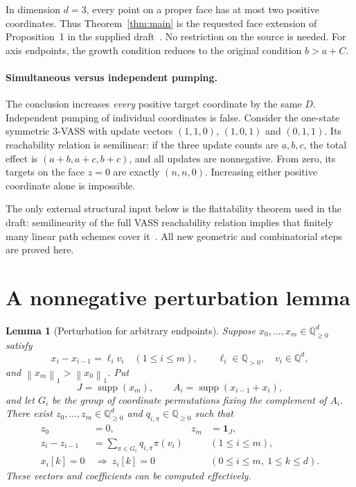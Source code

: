 \documentclass[11pt,a4paper]{article}
\newtheorem{lemma}[theorem]{Lemma}
\theoremstyle{remark}
\newcommand{\Q}{\mathbb Q}
\newcommand{\supp}{\operatorname{supp}}
\newcommand{\one}{\mathbf 1}
\newcommand{\norm}[1]{\left\lVert #1\right\rVert_1}
\begin{document}
In dimension $d=3$, every point on a proper face has at most two positive coordinates. Thus Theorem~\ref{thm:main} is the requested face extension of Proposition~1 in the supplied draft~\cite{draft}. No restriction on the source is needed. For axis endpoints, the growth condition reduces to the original condition $b>a+C$.

\paragraph{Simultaneous versus independent pumping.}
The conclusion increases \emph{every} positive target coordinate by the same $D$. Independent pumping of individual coordinates is false. Consider the one-state symmetric $3$-VASS with update vectors $(1,1,0)$, $(1,0,1)$ and $(0,1,1)$. Its reachability relation is semilinear: if the three update counts are $a,b,c$, the total effect is $(a+b,a+c,b+c)$, and all updates are nonnegative. From zero, its targets on the face $z=0$ are exactly $(n,n,0)$. Increasing either positive coordinate alone is impossible.

The only external structural input below is the flattability theorem used in the draft: semilinearity of the full VASS reachability relation implies that finitely many linear path schemes cover it~\cite{leroux}. All new geometric and combinatorial steps are proved here.

\newpage
\section{A nonnegative perturbation lemma}

\begin{lemma}[Perturbation for arbitrary endpoints]\label{lem:perturb}
Suppose $x_0,\ldots,x_m\in\Q_{\ge0}^d$ satisfy
\[
 x_i-x_{i-1}=\ell_i v_i\quad(1\le i\le m),\qquad
 \ell_i\in\Q_{>0},\quad v_i\in\Q^d,
\]
and $\norm{x_m}>\norm{x_0}$. Put
\[
 J=\supp(x_m),\qquad A_i=\supp(x_{i-1}+x_i),
\]
and let $G_i$ be the group of coordinate permutations fixing the complement of $A_i$. There exist $z_0,\ldots,z_m\in\Q_{\ge0}^d$ and $q_{i,\pi}\in\Q_{\ge0}$ such that
\begin{align}
 z_0&=0,& z_m&=\one_J,\label{eq:ends}\\
 z_i-z_{i-1}&=\sum_{\pi\in G_i}q_{i,\pi}\pi(v_i)
 &&(1\le i\le m),\label{eq:increments}\\
 x_i[k]=0&\ \Longrightarrow\ z_i[k]=0
 &&(0\le i\le m,\ 1\le k\le d).\label{eq:zeros}
\end{align}
These vectors and coefficients can be computed effectively.
\end{lemma}
\end{document}
